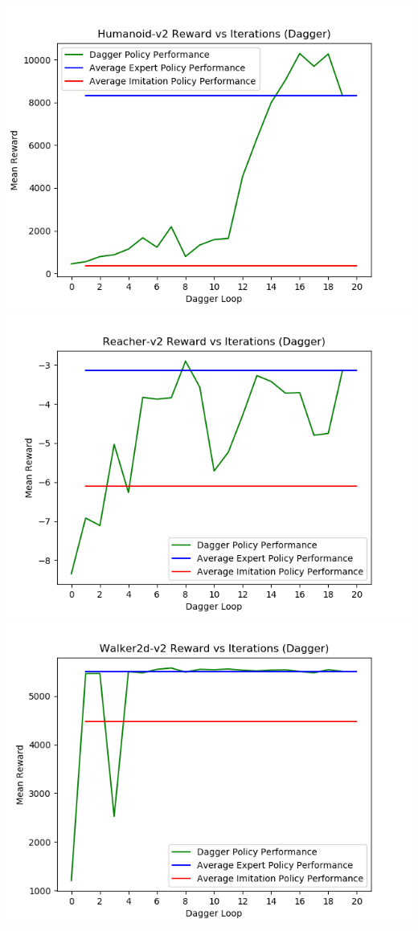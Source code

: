 \documentclass{article}
\begin{document}
    \includegraphics[scale=0.4]{Humanoid-v2Dagger}\\
    \includegraphics[scale=0.4]{Reacher-v2Dagger}
    \includegraphics[scale=0.4]{Walker2d-v2Dagger}\\
\end{document}
